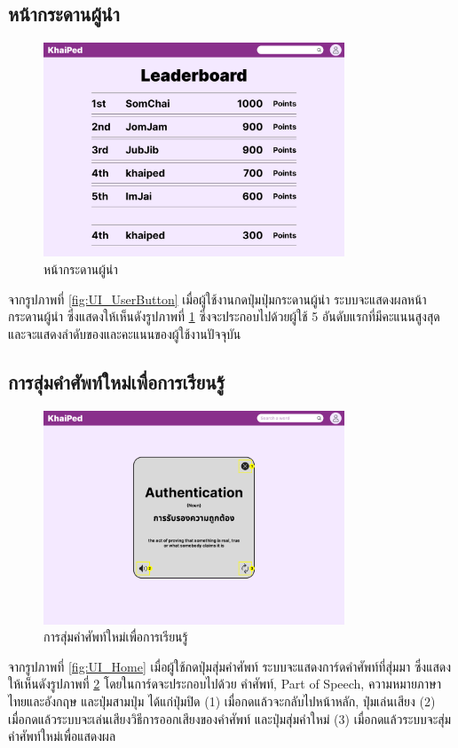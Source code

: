 \documentclass[12pt,oneside,openright,a4paper]{cpe-thai-project}
\begin{document}
\subsection{หน้ากระดานผู้นำ}
\begin{figure}[!h]\centering
	\includegraphics[width=0.8\textwidth, keepaspectratio=true]{image/chap3/ui/statistic/Leaderboard.png}
	\caption{หน้ากระดานผู้นำ}\label{fig:UI_Leaderboard}
\end{figure}
\hspace{1cm}
จากรูปภาพที่ \ref{fig:UI_UserButton} เมื่อผู้ใช้งานกดปุ่มปุ่มกระดานผู้นำ ระบบจะแสดงผลหน้ากระดานผู้นำ ซึ่งแสดงให้เห็นดังรูปภาพที่ \ref{fig:UI_Leaderboard}
ซึ่งจะประกอบไปด้วยผู้ใช้ 5 อันดับแรกที่มีคะแนนสูงสุด และจะแสดงลำดับของและคะแนนของผู้ใช้งานปัจจุบัน

\pagebreak
\subsection{การสุ่มคำศัพท์ใหม่เพื่อการเรียนรู้}
\begin{figure}[!h]\centering
	\includegraphics[width=0.8\textwidth, keepaspectratio=true]{image/chap3/ui/Random Word.png}
	\caption{การสุ่มคำศัพท์ใหม่เพื่อการเรียนรู้}\label{fig:UI_RandomWord}
\end{figure}
\hspace{1cm}
จากรูปภาพที่ \ref{fig:UI_Home} เมื่อผู้ใช้กดปุ่มสุ่มคำศัพท์ ระบบจะแสดงการ์ดคำศัพท์ที่สุ่มมา ซึ่งแสดงให้เห็นดังรูปภาพที่ \ref{fig:UI_RandomWord}
โดยในการ์ดจะประกอบไปด้วย คำศัพท์, Part of Speech, ความหมายภาษาไทยและอังกฤษ และปุ่มสามปุ่ม ได้แก่ปุ่มปิด (1)
เมื่อกดแล้วจะกลับไปหน้าหลัก, ปุ่มเล่นเสียง (2) เมื่อกดแล้วระบบจะเล่นเสียงวิธีการออกเสียงของคำศัพท์ และปุ่มสุ่มคำใหม่ (3) เมื่อกดแล้วระบบจะสุ่มคำศัพท์ใหม่เพื่อแสดงผล
\end{document}
